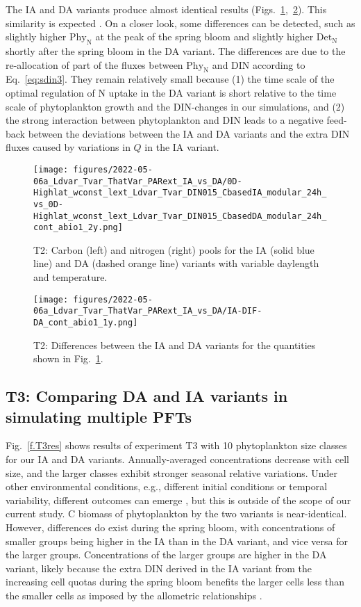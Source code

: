 \documentclass[gmd, manuscript]{copernicus}
\begin{document}
The IA and DA variants produce almost identical results (Figs.~\ref{f.T2res},~\ref{f.T2resdif}). This similarity is expected \citep{Ward2017}. On a closer look, some differences can be detected, such as slightly higher $\text{Phy}_{\text{N}}$ at the peak of the spring bloom and slightly higher $\text{Det}_{\text{N}}$ shortly after the spring bloom in the DA variant.  The differences are due to the re-allocation of part of the fluxes between $\text{Phy}_{\text{N}}$ and DIN according to Eq.~\eqref{eq:sdin3}.  They remain relatively small because (1) the time scale of the optimal regulation of N uptake in the DA variant is short relative to the time scale of phytoplankton growth and the DIN-changes in our simulations, and (2) the strong interaction between phytoplankton and DIN leads to a negative feed-back between the deviations between the IA and DA variants and the extra DIN fluxes caused by variations in $Q$ in the IA variant.

\begin{figure}[htb!]
\texttt{[image: figures/2022-05-06a\_Ldvar\_Tvar\_ThatVar\_PARext\_IA\_vs\_DA/0D-Highlat\_wconst\_lext\_Ldvar\_Tvar\_DIN015\_CbasedIA\_modular\_24h\_vs\_0D-Highlat\_wconst\_lext\_Ldvar\_Tvar\_DIN015\_CbasedDA\_modular\_24h\_cont\_abio1\_2y.png]}
\caption{T2: Carbon (left) and nitrogen (right) pools for the IA (solid blue line) and DA (dashed orange line) variants with variable daylength and temperature.
\label{f.T2res}}
\end{figure}

\begin{figure}[htb!]
\texttt{[image: figures/2022-05-06a\_Ldvar\_Tvar\_ThatVar\_PARext\_IA\_vs\_DA/IA-DIF-DA\_cont\_abio1\_1y.png]}
\caption{T2: Differences between the IA and DA variants for the quantities shown in Fig.~\ref{f.T2res}.\label{f.T2resdif}}
\end{figure}


\FloatBarrier%
\subsection{T3: Comparing DA and IA variants in simulating multiple PFTs}\label{s.resT3}

Fig.~\ref{f.T3res} shows results of experiment T3 with 10 phytoplankton size classes for our IA and DA variants. Annually-averaged concentrations decrease with cell size, and the larger classes exhibit stronger seasonal relative variations. Under other environmental conditions, e.g., different initial conditions or temporal variability, different outcomes can emerge \citep[see, e.g.,][]{Taherzadeh2017}, but this is outside of the scope of our current study.  C biomass of phytoplankton by the two variants is near-identical.  However, differences do exist during the spring bloom, with concentrations of smaller groups being higher in the IA than in the DA variant, and vice versa for the larger groups. Concentrations of the larger groups are higher in the DA variant, likely because the extra DIN derived in the IA variant from the increasing cell quotas during the spring bloom benefits the larger cells less than the smaller cells as imposed by the allometric relationships \citep[as in][]{Grover1991a,Litchman2009}.
\end{document}
